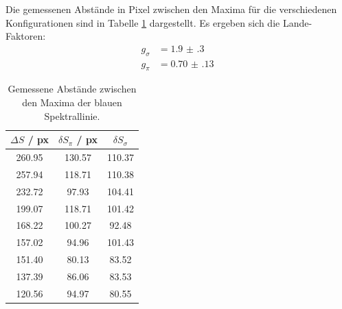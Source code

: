 Die gemessenen Abstände in Pixel zwischen den Maxima für die verschiedenen Konfigurationen sind in Tabelle \ref{tab:blau} dargestellt.
Es ergeben sich die Lande-Faktoren:
\begin{align}
  g_\sigma &= \SI{1.9(3)}{}\\
  g_\pi    &= \SI{0.70(13)}{}
\end{align}

\begin{table}
  \centering
  \begin{tabular}{c c c}
    \toprule
    $\Delta S$ / px & $\delta S_\pi$ / px & $\delta S_\sigma$\\
    \midrule
        \SI{260.95}{}  &   \SI{130.57}{}  & \SI{110.37}{} \\        
        \SI{257.94}{}  &   \SI{118.71}{}  & \SI{110.38}{} \\
        \SI{232.72}{}  &   \SI{ 97.93}{}  & \SI{104.41}{} \\
        \SI{199.07}{}  &   \SI{118.71}{}  & \SI{101.42}{} \\
        \SI{168.22}{}   &  \SI{100.27}{}  & \SI{ 92.48}{} \\
        \SI{157.02}{}   &  \SI{ 94.96}{}  & \SI{101.43}{} \\
        \SI{151.40}{}  &   \SI{ 80.13}{}  & \SI{ 83.52}{} \\
        \SI{137.39}{}   &  \SI{ 86.06}{}  & \SI{ 83.53}{} \\
        \SI{120.56}{}   &  \SI{ 94.97}{}  & \SI{ 80.55}{} \\
    \bottomrule
  \end{tabular}
  \caption{Gemessene Abstände zwischen den Maxima der blauen Spektrallinie.}
  \label{tab:blau}
\end{table}
